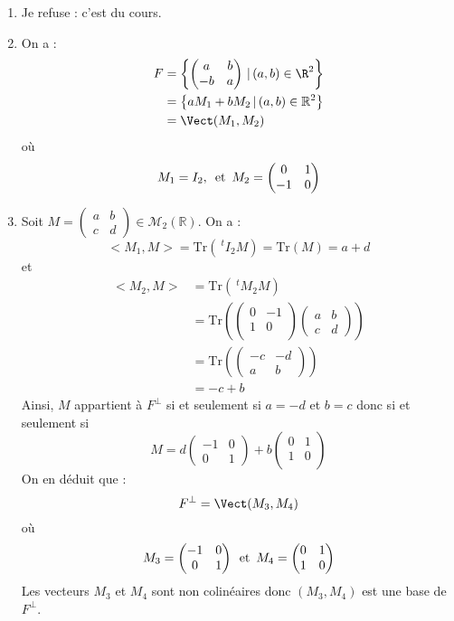 \documentclass[a4paper,twoside,french,11pt]{VcCours}
\begin{document}
\begin{enumerate}
\item Je refuse : c'est du cours.
\item On a :
\begin{align*}
F & =\left \lbrace \begin{pmatrix} a & b\\ -b & a \end{pmatrix} \, \vert \,  (a,b)\in\R^2\right\rbrace \\
& = \left\lbrace aM_1+bM_2 \, \vert \, (a,b) \in \mathbb{R}^2 \right\rbrace \\
& = \Vect(M_1,M_2)
\end{align*}
où
$$ M_1 = I_2, \, \hbox{ et } \, M_2 = \begin{pmatrix}
0 & 1 \\
-1 & 0 \\
\end{pmatrix}$$
\item Soit $M = \begin{pmatrix}
a & b \\
c & d 
\end{pmatrix} \in \mathcal{M}_2(\mathbb{R})$. On a :
$$<M_1,M> = \textrm{Tr}(~^tI_2 M) = \textrm{Tr}(M) = a+d$$
et 
\begin{align*}
<M_2,M> & = \textrm{Tr}(~^t M_2M) \\
& = \textrm{Tr} \left( \begin{pmatrix}
0 & -1 \\
1 & 0 \\
\end{pmatrix}  \begin{pmatrix}
a & b \\
c & d 
\end{pmatrix}  \right)   \\
& =  \textrm{Tr} \left( \begin{pmatrix}
-c & -d \\
a & b
\end{pmatrix} \right) \\
& = -c+b
\end{align*}
Ainsi, $M$ appartient à $F^{\perp}$ si et seulement si $a=-d$ et $b=c$ donc si et seulement si 
$$ M = d \begin{pmatrix}
-1 & 0 \\
0 & 1 
\end{pmatrix} + b \begin{pmatrix}
0 & 1 \\
1 & 0 \\
\end{pmatrix}$$
On en déduit que :
$$ F^{\perp} = \Vect(M_3,M_4)$$
où
$$ M_3 = \begin{pmatrix}
-1 & 0 \\
0 & 1 
\end{pmatrix} \, \hbox{ et } \, M_4 = \begin{pmatrix}
0 & 1 \\
1 & 0 
\end{pmatrix}$$
Les vecteurs $M_3$ et $M_4$ sont non colinéaires donc $(M_3,M_4)$ est une base de $F^{\perp}$.



\end{enumerate}
\end{document}
